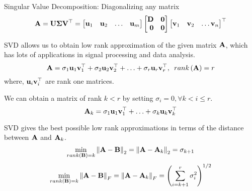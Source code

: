 \documentclass[aspectratio=169]{beamer}
\def\mf{\ensuremath\mathbf}
\def\lp{\ensuremath\left(}
\def\rp{\ensuremath\right)}
\def\lV{\ensuremath\left\lVert}
\def\rV{\ensuremath\right\rVert}
\def\bmx{\ensuremath\begin{bmatrix*}[r]}
\def\emx{\ensuremath\end{bmatrix*}}
\begin{document}
\begin{frame}[t]{Singular Value Decomposition: Diagonalizing any matrix}
\vspace{-0.5cm}
\[ \mf{A} = \mf{U}\mf{\Sigma}\mf{V}^\top = \bmx \mf{u}_1 & \mf{u}_2 & \ldots & \mf{u}_m\emx \bmx \mf{D} & \mf{0}\\ \mf{0} & \mf{0} \emx \bmx \mf{v}_1 & \mf{v}_2 & \ldots \mf{v}_n \emx^\top\]

SVD allows us to obtain low rank approximation of the given matrix $\mf{A}$, which has lots of applications in signal processing and data analysis.
\[ \mf{A} = \sigma_1\mf{u}_1\mf{v}_1^\top + \sigma_2\mf{u}_2\mf{v}_2^\top + \ldots + \sigma_r\mf{u}_r\mf{v}_r^\top, \,\,\, rank\lp\mf{A}\rp = r \]
where, $\mf{u}_i\mf{v}_i^\top$ are rank one matrices.

We can obtain a matrix of rank $k < r$ by setting $\sigma_i = 0, \forall k < i \leq r$.
\[ \mf{A}_{k} = \sigma_1\mf{u}_1\mf{v}_1^\top + \ldots + \sigma_{k}\mf{u}_{k}\mf{v}_{k}^\top \]

SVD gives the best possible low rank approximations in terms of the distance between $\mf{A}$ and $\mf{A}_k$.
\[ \min_{rank\lp\mf{B}\rp = k} \lV\mf{A} - \mf{B}\rV_2 = \lV\mf{A} - \mf{A}_k\rV_2 = \sigma_{k+1} \]\vspace{-0.4cm}
\[ \min_{rank\lp\mf{B}\rp = k} \lV\mf{A} - \mf{B}\rV_F = \lV\mf{A} - \mf{A}_k\rV_F = \lp\sum_{i=k+1}^{r}\sigma_{i}^2\rp^{1/2} \]
\end{frame}



\end{document}
